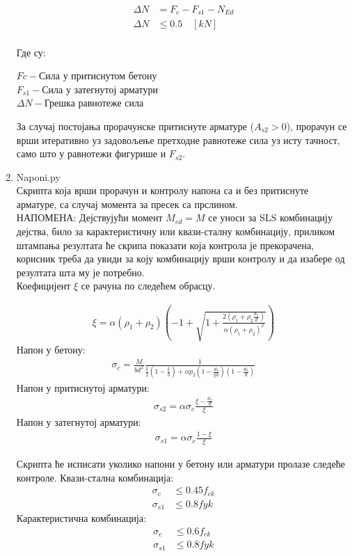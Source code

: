 \documentclass[11pt, a4paper]{article}
\begin{document}
\begin{enumerate}
\begin{align*}
	\Delta N &= F_{c} - F_{s1} - N_{Ed}\\
	\Delta N &\leq 0.5 \quad [kN]\\[2mm]
	\end{align*}

Где су:	
	
$Fc- \text{Сила у притиснутом бетону}$\\
$F_{s1}-\text{Сила у затегнутој арматури}$\\
$\Delta N -\text{Грешка равнотеже сила}$

За случај постојања прорачунске притиснуте арматуре ($A_{s2} > 0$), прорачун се врши итеративно уз задовољење претходне равнотеже сила уз исту тачност, само што у равнотежи фигурише и $F_{s2}$.

\item {\Large{Naponi.py}}\\[5mm]
Скрипта која врши прорачун и контролу напона са и без притиснуте арматуре, са случај момента за пресек са прслином.\\
НАПОМЕНА: Дејствујући момент $M_{ed}=M$ се уноси за SLS комбинацију дејства, било за карактеристичну или квази-сталну комбинацију, приликом штампања резултата ће скрипа показати која контрола је прекорачена, корисник треба да увиди за коју комбинацију врши контролу и да изабере од резултата шта му је потребно.\\
Коефицијент $\xi$ се рачуна по следећем обрасцу.

\begin{align*}
	\xi=\alpha\left(\rho_{1}+\rho_{2}\right)(-1+\sqrt{1+\frac{2\left(\rho_{1}+\rho_{2} \frac{d_{2}}{d}\right)}{\alpha\left(\rho_{1}+\rho_{2}\right)^{2}}})
\end{align*}
Напон у бетону:
\begin{align*}
	\sigma_{c}=\frac{M}{b d^{2}} \frac{1}{\frac{\xi}{2}\left(1-\frac{\xi}{3}\right)+\alpha p_{2}\left(1-\frac{d_{2}}{\xi d}\right)\left(1-\frac{d_{2}}{d}\right)}
\end{align*}
Напон у притиснутој арматури:
\begin{align*}
	\sigma_{s 2}=\alpha \sigma_{c} \frac{\xi-\frac{d_{2}}{d}}{\xi}
\end{align*}
Напон у затегнутој арматури:
\begin{align*}
	\sigma_{s 1}=\alpha \sigma_{c} \frac{1-\xi}{\xi}
\end{align*}

Скрипта ће исписати уколико напони у бетону или арматури пролазе следеће контроле.
Квази-стална комбинација: 
\begin{align*}
	\sigma_c &\leq 0.45f_{ck}\\
	\sigma_{s1} &\leq 0.8f{yk}
\end{align*}
Карактеристична комбинација:
\begin{align*}
	\sigma_c &\leq 0.6f_{ck}\\
	\sigma_{s1} &\leq 0.8f{yk}
\end{align*}


\end{enumerate}
\end{document}
